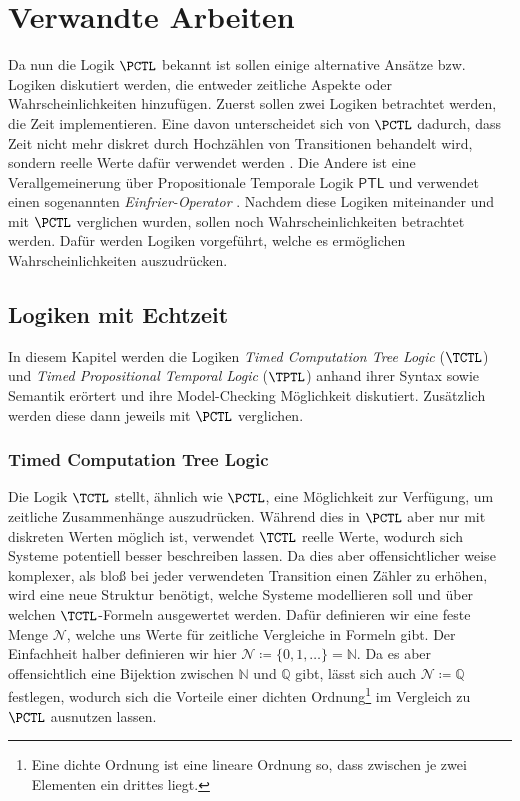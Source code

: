 \section{Verwandte Arbeiten}
\label{ChapVerwandt}

Da nun die Logik $\PCTL$ bekannt ist sollen einige alternative Ansätze bzw. Logiken diskutiert werden, die entweder zeitliche Aspekte oder Wahrscheinlichkeiten hinzufügen.
Zuerst sollen zwei Logiken betrachtet werden, die Zeit implementieren. 
Eine davon unterscheidet sich von $\PCTL$ dadurch, dass Zeit nicht mehr diskret durch Hochzählen von Transitionen behandelt wird, sondern reelle Werte dafür verwendet werden \cite{alur1990model}. 
Die Andere ist eine Verallgemeinerung über Propositionale Temporale Logik $\mathsf{PTL}$ und verwendet einen sogenannten \textit{Einfrier-Operator} \cite{alur1994really}.
Nachdem diese Logiken miteinander und mit $\PCTL$ verglichen wurden, sollen noch Wahrscheinlichkeiten betrachtet werden.
Dafür werden Logiken vorgeführt, welche es ermöglichen Wahrscheinlichkeiten auszudrücken.


\subsection{Logiken mit Echtzeit}

In diesem Kapitel werden die Logiken \textit{Timed Computation Tree Logic} ($\TCTL$) und \textit{Timed Propositional Temporal Logic} ($\TPTL$) anhand ihrer Syntax sowie Semantik erörtert und ihre Model-Checking Möglichkeit diskutiert. 
Zusätzlich werden diese dann jeweils mit $\PCTL$ verglichen.

\subsubsection{Timed Computation Tree Logic}

Die Logik $\TCTL$ stellt, ähnlich wie $\PCTL$, eine Möglichkeit zur Verfügung, um zeitliche Zusammenhänge auszudrücken.
Während dies in $\PCTL$ aber nur mit diskreten Werten möglich ist, verwendet $\TCTL$ reelle Werte, wodurch sich Systeme potentiell besser beschreiben lassen.
Da dies aber offensichtlicher weise komplexer, als bloß bei jeder verwendeten Transition einen Zähler zu erhöhen, wird eine neue Struktur benötigt, welche Systeme modellieren soll und über welchen $\TCTL$-Formeln ausgewertet werden.
Dafür definieren wir eine feste Menge $\mathcal{N}$, welche uns Werte für zeitliche Vergleiche in Formeln gibt.
Der Einfachheit halber definieren wir hier $\mathcal{N}\coloneqq\{0,1,\dots\}=\mathbb{N}$.
Da es aber offensichtlich eine Bijektion zwischen $\mathbb{N}$ und $\mathbb{Q}$ gibt, lässt sich auch $\mathcal{N}\coloneqq\mathbb{Q}$ festlegen, wodurch sich die Vorteile einer dichten Ordnung\footnote{Eine dichte Ordnung ist eine lineare Ordnung so, dass zwischen je zwei Elementen ein drittes liegt.} im Vergleich zu $\PCTL$ ausnutzen lassen.

